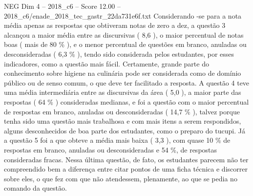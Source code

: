 \begin{textsample}{NEG Dim 4 – 2018\_c6 – Score 12.00 – 2018\_c6/enade\_2018\_tec\_gastr\_22da731e6f.txt}
Considerando -se para a nota média apenas as respostas que obtiveram notas de zero a dez, a questão 3 alcançou a maior média entre as discursivas ( 8,6 ), o maior percentual de notas boas ( mais de 80 \% ), e o menor percentual de questões em branco, anuladas ou desconsideradas ( 6,3 \% ), tendo sido considerada pelos estudantes, por esses indicadores, como a questão mais fácil.
Certamente, grande parte do conhecimento sobre higiene na culinária pode ser considerada como de domínio público ou de senso comum, o que deve ter facilitado a resposta.
A questão 4 teve uma média intermediária entre as discursivas da área ( 5,0 ), a maior parte das respostas ( 64 \% ) consideradas medianas, e foi a questão com o maior percentual de respostas em branco, anuladas ou desconsideradas ( 14,7 \% ), talvez porque tenha sido uma questão mais trabalhosa e com mais itens a serem respondidos, alguns desconhecidos de boa parte dos estudantes, como o preparo do tucupi.
Já a questão 5 foi a que obteve a média mais baixa ( 3,3 ), com quase 10 \% de respostas em branco, anuladas ou desconsideradas e 54 \%, de respostas consideradas fracas.
Nessa última questão, de fato, os estudantes parecem não ter compreendido bem a diferença entre citar pontos de uma ficha técnica e discorrer sobre eles, o que fez com que não atendessem, plenamente, ao que se pedia no comando da questão.

\end{textsample}
